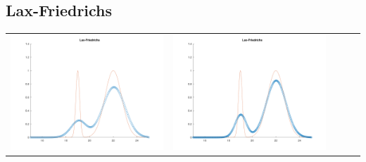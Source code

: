 \documentclass{article}
\begin{document}
\subsection{Lax-Friedrichs}
\begin{table}[h]
    \centering
        \begin{tabular}{ccccc}
            \includegraphics[scale = 0.17]{LF.png} & \includegraphics[scale = 0.17]{LF2.png} \\

\end{tabular}
\end{table}
\end{document}

